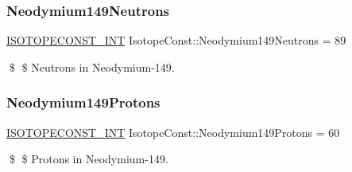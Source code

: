 \subsubsection{\texorpdfstring{Neodymium149\+Neutrons}{Neodymium149Neutrons}}
{\footnotesize\ttfamily \mbox{\hyperlink{group___isotope_const-_macros_ga5f18360b3e99483a35c32d789e62621c}{I\+S\+O\+T\+O\+P\+E\+C\+O\+N\+S\+T\+\_\+\+I\+NT}} Isotope\+Const\+::\+Neodymium149\+Neutrons = 89}

\$ \$ Neutrons in Neodymium-\/149. \mbox{\label{group___isotope_const-_neodymium-_nd149_gaab24633ba64d9ac283f7f897c2a4fff1}} 
\subsubsection{\texorpdfstring{Neodymium149\+Protons}{Neodymium149Protons}}
{\footnotesize\ttfamily \mbox{\hyperlink{group___isotope_const-_macros_ga5f18360b3e99483a35c32d789e62621c}{I\+S\+O\+T\+O\+P\+E\+C\+O\+N\+S\+T\+\_\+\+I\+NT}} Isotope\+Const\+::\+Neodymium149\+Protons = 60}

\$ \$ Protons in Neodymium-\/149. 